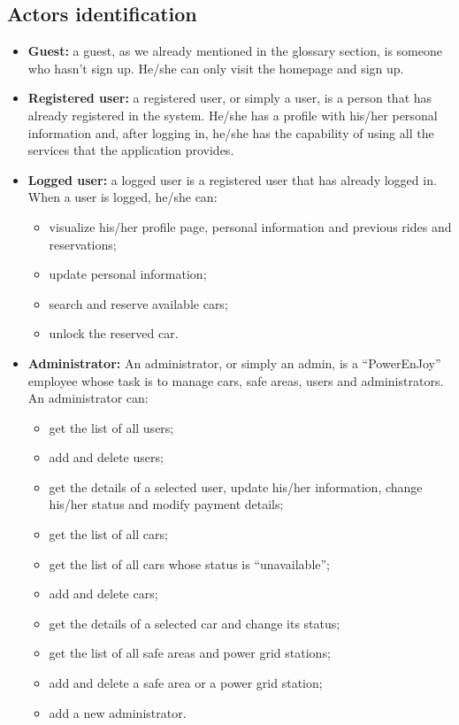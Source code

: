 \pagebreak
\subsection{Actors identification}

\newcommand{\actor}[2]{
	\item \textbf{#1:} #2}

\begin{itemize}
	\actor {Guest}{a guest, as we already mentioned in the glossary section, is someone who hasn't sign up. He/she can only visit the homepage and sign up.}
	
	\actor{Registered user}{a registered user, or simply a user, is a person that has already registered in the system. He/she has a profile with his/her personal information and, after logging in, he/she has the capability of using all the services that the application provides.}
	
	\actor{Logged user}{a logged user is a registered user that has already logged in. When a user is logged, he/she can:
		\begin{itemize}
			\item visualize his/her profile page, personal information and previous rides and reservations;
			\item update personal information;
			\item search and reserve available cars;
			\item unlock the reserved car.
		\end{itemize}
	}

	\actor{Administrator}{An administrator, or simply an admin, is a ``PowerEnJoy'' employee whose task is to manage cars, safe areas, users and administrators. An administrator can:
		\begin{itemize}
			\item get the list of all users;
			\item add and delete users;
			\item get the details of a selected user, update his/her information, change his/her status and modify payment details;
			\item get the list of all cars;
			\item get the list of all cars whose status is ``unavailable'';
			\item add and delete cars;
			\item get the details of a selected car and change its status;
			\item get the list of all safe areas and power grid stations;
			\item add and delete a safe area or a power grid station;
			\item add a new administrator.
		\end{itemize}}
	
\end{itemize}